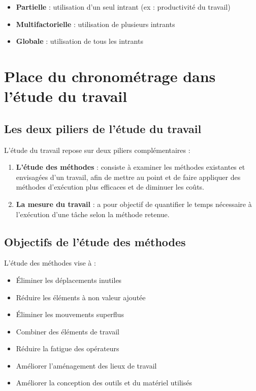 \documentclass[a4paper,12pt]{article}
\begin{document}
\begin{itemize}
    \item \textbf{Partielle} : utilisation d'un seul intrant (ex : productivité du travail)
    \item \textbf{Multifactorielle} : utilisation de plusieurs intrants
    \item \textbf{Globale} : utilisation de tous les intrants
\end{itemize}

\section{Place du chronométrage dans l'étude du travail}

\subsection{Les deux piliers de l'étude du travail}

L'étude du travail repose sur deux piliers complémentaires :

\begin{enumerate}
    \item \textbf{L'étude des méthodes} : consiste à examiner les méthodes existantes et envisagées d'un travail, afin de mettre au point et de faire appliquer des méthodes d'exécution plus efficaces et de diminuer les coûts.
    
    \item \textbf{La mesure du travail} : a pour objectif de quantifier le temps nécessaire à l'exécution d'une tâche selon la méthode retenue.
\end{enumerate}

\subsection{Objectifs de l'étude des méthodes}

L'étude des méthodes vise à :
\begin{itemize}
    \item Éliminer les déplacements inutiles
    \item Réduire les éléments à non valeur ajoutée
    \item Éliminer les mouvements superflus
    \item Combiner des éléments de travail
    \item Réduire la fatigue des opérateurs
    \item Améliorer l'aménagement des lieux de travail
    \item Améliorer la conception des outils et du matériel utilisés
\end{itemize}
\end{document}
